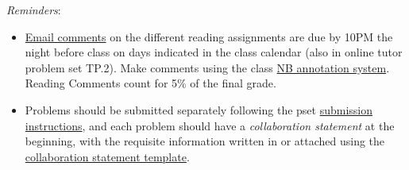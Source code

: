 \documentclass[handout]{mcs}
\begin{document}
\renewcommand{\reading}{Part~\bref{part:proofs}{. \emph{Proofs:
      Introduction}}, Chapter~\bref{proofs_chap}{, \emph{What is a
      Proof?}}; Chapter~\bref{well_ordering_chap}{, \emph{The Well
      Ordering Principle}}; and Chapter~\bref{logicform_chap}{ through
    \bref{SAT_sec}{, covering \emph{Propositional Logic}}}.  These
  assigned readings \textbf{do not include the Problem sections}.  (Many
  of the problems in the text will appear as class or homework problems.)}


  \emph{Reminders}:
\begin{itemize}

\item 

  \href{http://courses.csail.mit.edu/6.042/spring12/courseinfo#comments}{Email
    comments} on the different reading assignments are due by 10PM the
  night before class on days indicated in the class calendar (also in
  online tutor problem set TP.2).  Make comments using the class
  \href{http://nb.csail.mit.edu}{NB annotation system}.  Reading
  Comments count for 5\% of the final grade.

\item Problems should be submitted separately following the pset
  \href{http://courses.csail.mit.edu/6.042/spring12/submission}{submission
    instructions}, and each problem should have a \emph{collaboration
    statement} at the beginning, with the requisite information
  written in or attached using the
  \href{http://courses.csail.mit.edu/6.042/spring12/submission_template.pdf}{collaboration
    statement template}.

 \end{itemize}








\iffalse
\begin{center}
\large \textbf{Optional:}
\end{center}

\pinput{PS_faster_adder_logic}
\fi

\end{document}
